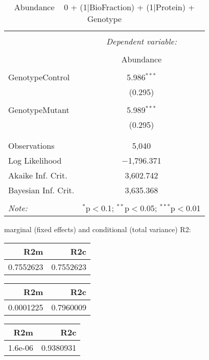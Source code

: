 \documentclass[11pt]{report}
\begin{document}
\begin{table}[!htbp] \centering 
  \caption{Abundance ~ 0 + (1|BioFraction) + (1|Protein) + Genotype} 
  \label{} 
\begin{tabular}{@{\extracolsep{5pt}}lc} 
\\[-1.8ex]\hline 
\hline \\[-1.8ex] 
 & \multicolumn{1}{c}{\textit{Dependent variable:}} \\ 
\cline{2-2} 
\\[-1.8ex] & Abundance \\ 
\hline \\[-1.8ex] 
 GenotypeControl & 5.986$^{***}$ \\ 
  & (0.295) \\ 
  & \\ 
 GenotypeMutant & 5.989$^{***}$ \\ 
  & (0.295) \\ 
  & \\ 
\hline \\[-1.8ex] 
Observations & 5,040 \\ 
Log Likelihood & $-$1,796.371 \\ 
Akaike Inf. Crit. & 3,602.742 \\ 
Bayesian Inf. Crit. & 3,635.368 \\ 
\hline 
\hline \\[-1.8ex] 
\textit{Note:}  & \multicolumn{1}{r}{$^{*}$p$<$0.1; $^{**}$p$<$0.05; $^{***}$p$<$0.01} \\ 
\end{tabular} 
\end{table} 
marginal (fixed effects) and conditional (total variance) R2:

\begin{tabular}{r|r}
\hline
R2m & R2c\\
\hline
0.7552623 & 0.7552623\\
\hline
\end{tabular}

\begin{tabular}{r|r}
\hline
R2m & R2c\\
\hline
0.0001225 & 0.7960009\\
\hline
\end{tabular}

\begin{tabular}{r|r}
\hline
R2m & R2c\\
\hline
1.6e-06 & 0.9380931\\
\hline
\end{tabular}
\end{document}
